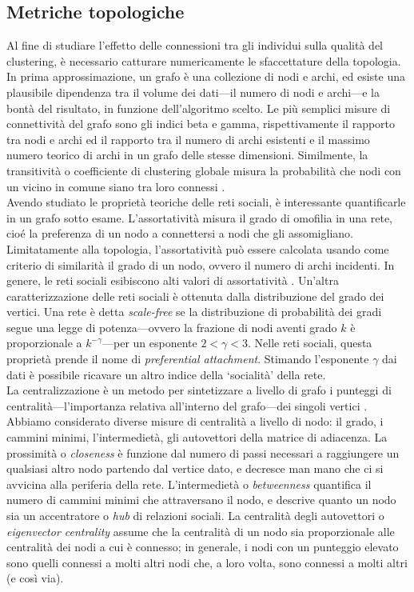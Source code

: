 \subsection{Metriche topologiche}
\label{topo_metrics}
Al fine di studiare l'effetto delle connessioni tra gli individui sulla qualit\`a del clustering, \`e necessario catturare numericamente le sfaccettature della topologia. In prima approssimazione, un grafo \`e una collezione di nodi e archi, ed esiste una plausibile dipendenza tra il volume dei dati---il numero di nodi e archi---e la bont\`a del risultato, in funzione dell'algoritmo scelto.
Le pi\`u semplici misure di connettivit\`a del grafo sono gli indici beta e gamma, rispettivamente il rapporto tra nodi e archi ed il rapporto tra il numero di archi esistenti e il massimo numero teorico di archi in un grafo delle stesse dimensioni. Similmente, la transitivit\`a o coefficiente di clustering globale misura la probabilit\`a che nodi con un vicino in comune siano tra loro connessi \cite{wasserman1994social}.\\
Avendo studiato le propriet\`a teoriche delle reti sociali, \`e interessante quantificarle in un grafo sotto esame. L'assortativit\`a misura il grado di omofilia in una rete, cio\'e la preferenza di un nodo a connettersi a nodi che gli assomigliano. Limitatamente alla topologia, l'assortativit\`a pu\`o essere calcolata usando come criterio di similarit\`a il grado di un nodo, ovvero il numero di archi incidenti. In genere, le reti sociali esibiscono alti valori di assortativit\`a \cite{newman03social,newman02}. Un'altra caratterizzazione delle reti sociali \`e ottenuta dalla distribuzione del grado dei vertici. Una rete \`e detta \textit{scale-free} se la distribuzione di probabilit\`a dei gradi segue una legge di potenza---ovvero la frazione di nodi aventi grado $k$ \`e proporzionale a $k^{-\gamma}$---per un esponente $2<\gamma<3$. Nelle reti sociali, questa propriet\`a prende il nome di \textit{preferential attachment}\cite{Barabasi99emergenceScaling}. Stimando l'esponente $\gamma$ dai dati \`e possibile ricavare un altro indice della `socialit\`a' della rete.\\
La centralizzazione \`e un metodo per sintetizzare a livello di grafo i punteggi di centralit\`a---l'importanza relativa all'interno del grafo---dei singoli vertici \cite{freeman1979centrality,wasserman1994social}. Abbiamo considerato diverse misure di centralit\`a a livello di nodo: il grado, i cammini minimi, l'intermediet\`a, gli autovettori della matrice di adiacenza. La prossimit\`a o \textit{closeness} \`e funzione dal numero di passi necessari a raggiungere un qualsiasi altro nodo partendo dal vertice dato, e decresce man mano che ci si avvicina alla periferia della rete. L'intermediet\`a o \textit{betweenness} quantifica il numero di cammini minimi che attraversano il nodo, e descrive quanto un nodo sia un accentratore o \textit{hub} di relazioni sociali. La centralit\`a degli autovettori o \textit{eigenvector centrality} \cite{bonacich1987power} assume che la centralit\`a di un nodo sia proporzionale alle centralit\`a dei nodi a cui \`e connesso; in generale, i nodi con un punteggio elevato sono quelli connessi a molti altri nodi che, a loro volta, sono connessi a molti altri (e cos\`i via).\\
